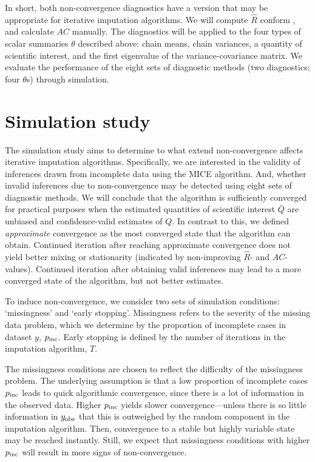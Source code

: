 \documentclass[Royal,times,sageh]{sagej}
\begin{document}
In short, both non-convergence diagnostics have a version that may be appropriate for iterative imputation algorithms. We will compute \(\widehat{R}\) conform \citet{veht19}, and calculate \(AC\) manually. The diagnostics will be applied to the four types of scalar summaries \(\theta\) described above: chain means, chain variances, a quantity of scientific interest, and the first eigenvalue of the variance-covariance matrix. We evaluate the performance of the eight sets of diagnostic methods (two diagnostics; four \(\theta\)s) through simulation.

\hypertarget{simulation-study}{%
\section{Simulation study}\label{simulation-study}}

The simulation study aims to determine to what extend non-convergence affects iterative imputation algorithms. Specifically, we are interested in the validity of inferences drawn from incomplete data using the MICE algorithm. And, whether invalid inferences due to non-convergence may be detected using eight sets of diagnostic methods. We will conclude that the algorithm is sufficiently converged for practical purposes when the estimated quantities of scientific interest \(\bar{Q}\) are unbiased and confidence-valid estimates of \({Q}\). In contrast to this, we defined \emph{approximate} convergence as the most converged state that the algorithm can obtain. Continued iteration after reaching approximate convergence does not yield better mixing or stationarity (indicated by non-improving \(\widehat{R}\)- and \(AC\)-values). Continued iteration after obtaining valid inferences may lead to a more converged state of the algorithm, but not better estimates.

To induce non-convergence, we consider two sets of simulation conditions: `missingness' and `early stopping'. Missingness refers to the severity of the missing data problem, which we determine by the proportion of incomplete cases in dataset \(y\), \(p_{\rm inc}\). Early stopping is defined by the number of iterations in the imputation algorithm, \(T\).

The missingness conditions are chosen to reflect the difficulty of the missingness problem. The underlying assumption is that a low proportion of incomplete cases \(p_{\rm inc}\) leads to quick algorithmic convergence, since there is a lot of information in the observed data. Higher \(p_{\rm inc}\) yields slower convergence---unless there is so little information in \(y_{\rm obs}\) that this is outweighed by the random component in the imputation algorithm. Then, convergence to a stable but highly variable state may be reached instantly. Still, we expect that missingness conditions with higher \(p_{\rm inc}\) will result in more signs of non-convergence.
\end{document}
